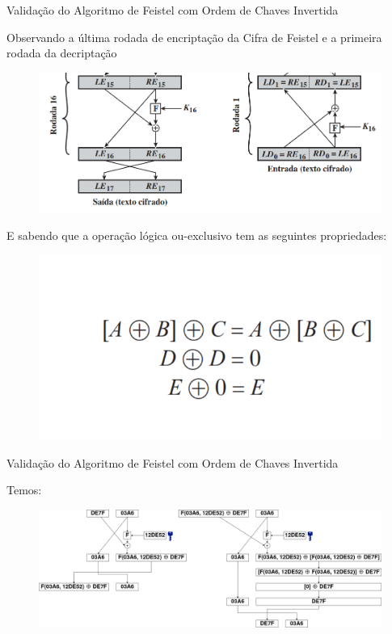\begin{frame}{Validação do Algoritmo de Feistel com Ordem de Chaves Invertida}

    Observando a última rodada de encriptação da Cifra de Feistel e a primeira rodada da decriptação
    \begin{figure}
        \centering
        \includegraphics[width=0.5\linewidth]{Figuras/ultima-milha-feistel.png}

    \end{figure}

    E sabendo que a  operação lógica ou-exclusivo  tem as
    seguintes propriedades:

    \begin{figure}
        \centering
        \includegraphics[width=0.4\linewidth]{Figuras/propriedades-xor-feistel.png}

    \end{figure}

\end{frame}

\begin{frame}{Validação do Algoritmo de Feistel com Ordem de Chaves Invertida}

    Temos:
    \begin{figure}
        \centering
        \includegraphics[width=0.9\linewidth]{Figuras/feistel.png}

    \end{figure}



\end{frame}

